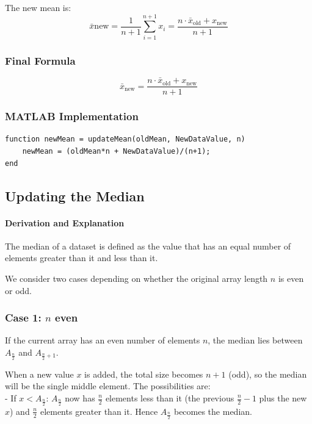 \documentclass{report}
\begin{document}
The new mean is:
\[
\bar{x}{\text{new}} = \frac{1}{n+1} \sum_{i=1}^{n+1} x_i
= \frac{n \cdot \bar{x}_{\text{old}} + x_{\text{new}}}{n+1}
\]

\subsubsection*{Final Formula}
\[
\boxed{\bar{x}_{\text{new}} = \frac{n \cdot \bar{x}_{\text{old}} + x_{\text{new}}}{n+1}}
\]

\subsubsection*{MATLAB Implementation}
\begin{verbatim}
function newMean = updateMean(oldMean, NewDataValue, n)
    newMean = (oldMean*n + NewDataValue)/(n+1);
end
\end{verbatim}

\subsection{Updating the Median}

\paragraph{Derivation and Explanation}  
The median of a dataset is defined as the value that has an equal number of elements greater than it and less than it.  

We consider two cases depending on whether the original array length $n$ is even or odd.  

\subsubsection*{Case 1: $n$ even}  
If the current array has an even number of elements $n$, the median lies between $A_{\frac{n}{2}}$ and $A_{\frac{n}{2} + 1}$.  


When a new value $x$ is added, the total size becomes $n+1$ (odd), so the median will be the single middle element. The possibilities are:\\  


- If $x < A_{\frac{n}{2}}$:  
  $A_{\frac{n}{2}}$ now has $\frac{n}{2}$ elements less than it (the previous $\frac{n}{2} - 1$ plus the new $x$) and $\frac{n}{2}$ elements greater than it. Hence $A_{\frac{n}{2}}$ becomes the median.\\
\end{document}
